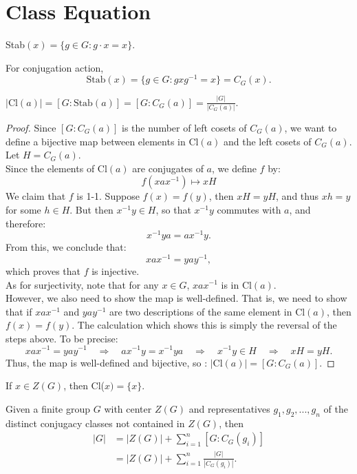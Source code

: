 \section{Class Equation}
\begin{definition}
    Stab$(x) = \{g \in G: g \cdot x = x\}$.
\end{definition}
For conjugation action, 
\[
\text{Stab} (x) = \{g\in G: gxg^{-1} = x\} = C_G(x).
\]
\begin{theorem}
    $|\text{Cl}(a)| = [G: \text{Stab}(a)] = [G:C_G(a)] = \frac{|G|}{|C_G(a)|}.$
\end{theorem}
\begin{proof}
    Since \([G : C_G(a)]\) is the number of left cosets of \( C_G(a) \), we want to define a bijective map between elements in \( \text{Cl}(a) \) and the left cosets of \( C_G(a) \).\\
    Let \( H = C_G(a) \).\\
    Since the elements of \( \text{Cl}(a) \) are conjugates of \( a \), we define \( f \) by:
    \[
    f(xa x^{-1}) \mapsto xH
    \]
    We claim that \( f \) is 1-1. Suppose \( f(x) = f(y) \), then \( xH = yH \), and thus \( xh = y \) for some \( h \in H \). But then \( x^{-1}y \in H \), so that \( x^{-1}y \) commutes with \( a \), and therefore:
    \[
    x^{-1}y a = a x^{-1}y.
    \]
    From this, we conclude that:
    \[
    x a x^{-1} = y a y^{-1},
    \]
    which proves that \( f \) is injective.\\
    As for surjectivity, note that for any \( x \in G \), \( x a x^{-1} \) is in \( \text{Cl}(a) \).\\
    However, we also need to show the map is well-defined. That is, we need to show that if \( x a x^{-1} \) and \( y a y^{-1} \) are two descriptions of the same element in \( \text{Cl}(a) \), then \( f(x) = f(y) \). The calculation which shows this is simply the reversal of the steps above. To be precise:
    \[
    x a x^{-1} = y a y^{-1} \quad \Rightarrow \quad a x^{-1} y = x^{-1} y a \quad \Rightarrow \quad x^{-1} y \in H \quad \Rightarrow \quad xH = yH.
    \]
    Thus, the map is well-defined and bijective, so : $|\text{Cl}(a)| = [G : C_G(a)]$.
\end{proof}
\begin{lemma}
    If $x \in Z(G)$, then Cl($x) = \{x\}$.
\end{lemma}
\begin{theorem}
    Given a finite group $G$ with center $Z(G)$ and representatives $g_1, g_2, ..., g_n$ of the distinct conjugacy classes not contained in $Z(G)$, then 
    \begin{align*}
        |G| &= |Z(G)| + \sum_{i=1}^{n}[G:C_G(g_i)]\\
            &= |Z(G)| + \sum_{i=1}^{n}\frac{|G|}{|C_G(g_i)|}.
    \end{align*} 
\end{theorem}
